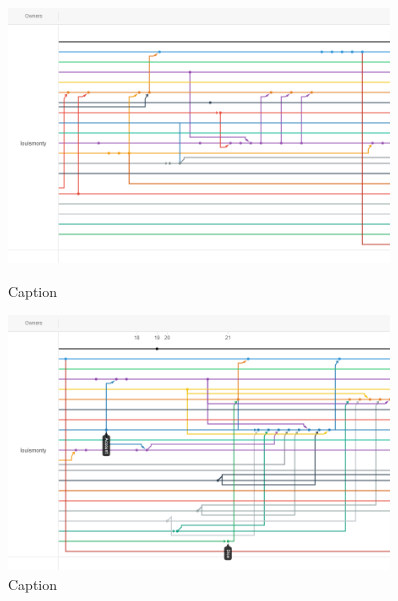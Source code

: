 \begin{figure}
    \includegraphics[width=0.9\textwidth]{Report/root/5.png}
    \caption{Caption}
    \includegraphics[width=0.9\textwidth]{Report/root/6.png}
    \caption{Caption}
    \end{figure}
